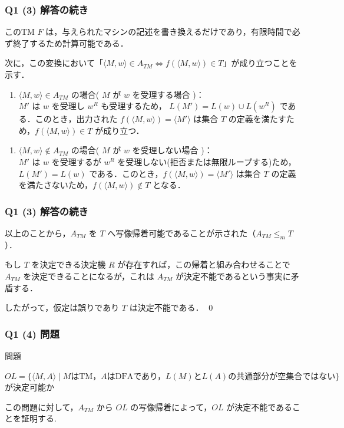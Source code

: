 \begin{frame}[fragile]
\frametitle{Q1 (3) 解答の続き}

このTM $F$ は，与えられたマシンの記述を書き換えるだけであり，有限時間で必ず終了するため計算可能である．

次に，この変換において「$\langle M, w \rangle \in A_{TM} \Leftrightarrow f(\langle M, w \rangle) \in T$」が成り立つことを示す．

\begin{enumerate}
  \item[・] $\langle M, w \rangle \in A_{TM}$ の場合( $M$ が $w$ を受理する場合 )： \\
$M'$ は $w$ を受理し $w^R$ も受理するため， $L(M') = L(w) \cup L(w^R)$ である．このとき，出力された $f(\langle M, w \rangle) = \langle M' \rangle$ は集合 $T$ の定義を満たすため，$f(\langle M, w \rangle) \in T$ が成り立つ．
\end{enumerate}

\begin{enumerate}
  \item[・] $\langle M, w \rangle \notin A_{TM}$ の場合( $M$ が $w$ を受理しない場合 )： \\
$M'$ は $w$ を受理するが $w^R$ を受理しない(拒否または無限ループする)ため， $L(M') = L(w)$ である．このとき，$f(\langle M, w \rangle) = \langle M' \rangle$ は集合 $T$ の定義を満たさないため，$f(\langle M, w \rangle) \notin T$ となる．
\end{enumerate}

\end{frame}



\begin{frame}[fragile]
\frametitle{Q1 (3) 解答の続き}

以上のことから，$A_{TM}$ を $T$ へ写像帰着可能であることが示された（$A_{TM} \le_{m} T$）．

もし $T$ を決定できる決定機 $R$ が存在すれば，この帰着と組み合わせることで $A_{TM}$ を決定できることになるが，これは $A_{TM}$ が決定不能であるという事実に矛盾する．

したがって，仮定は誤りであり $T$ は決定不能である．
\hfill \qed

\end{frame}





\begin{frame}[fragile]
\frametitle{Q1 (4) 問題}

\begin{alertblock}{問題}

$OL = \{\langle M, A \rangle \mid M \text{はTM，} A \text{はDFAであり，} L(M) \text{と} L(A) \text{の共通部分が空集合ではない}\}$ \\
が決定可能か

\end{alertblock}

この問題に対して，$A_{TM}$ から $OL$ の写像帰着によって，$OL$ が決定不能であることを証明する.

\end{frame}




